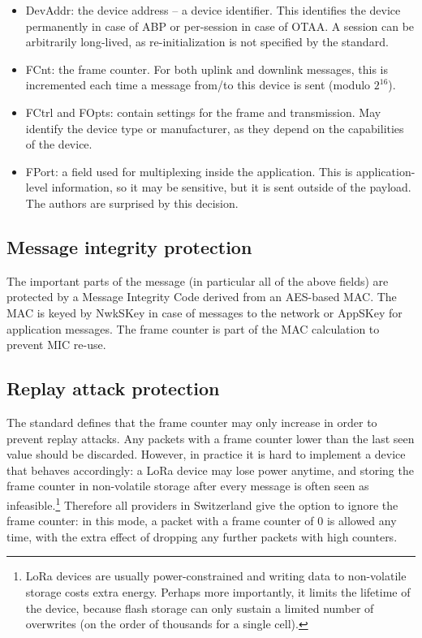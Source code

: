 \begin{itemize}
\tightlist
\item
  {DevAddr: the device address -- a device identifier. This identifies
  the device permanently in case of ABP or per-session in case of OTAA.
  A session can be arbitrarily long-lived, as re-initialization is not
  specified by the standard.}
\item
  {FCnt: the frame counter. For both uplink and downlink messages, this
  is incremented each time a message from/to this device is sent (modulo
  $2^{16}$).}
\item
  {FCtrl and FOpts: contain settings for the frame and transmission. May
  identify the device type or manufacturer, as they depend on the
  capabilities of the device.}
\item
  {FPort: a field used for multiplexing inside the application. This is
  application-level information, so it may be sensitive, but it is sent
  outside of the payload. The authors are surprised by this decision.}
\end{itemize}

\subsection{Message integrity protection}

{The important parts of the message (in particular all of the above
fields) are protected by a Message Integrity Code derived from an
AES-based MAC. The MAC is keyed by NwkSKey in case of messages to the
network or AppSKey for application messages. The frame counter is part
of the MAC calculation to prevent MIC re-use.}

\subsection{Replay attack protection}

{The standard defines that the frame counter may only increase in order
to prevent replay attacks. Any packets with a frame counter lower than
the last seen value should be discarded. However, in practice it is hard
to implement a device that behaves accordingly: a LoRa device may lose
power anytime, and storing the frame counter in non-volatile storage
after every message is often seen as
infeasible.\footnote{LoRa devices are usually power-constrained and writing data to non-volatile storage costs extra energy. Perhaps more importantly, it limits the lifetime of the device, because flash storage can only sustain a limited number of overwrites (on the order of thousands for a single cell).} Therefore
all providers in Switzerland give the option to ignore the frame
counter: in this mode, a packet with a frame counter of 0 is allowed any
time, with the extra effect of dropping any further packets with high
counters.}


